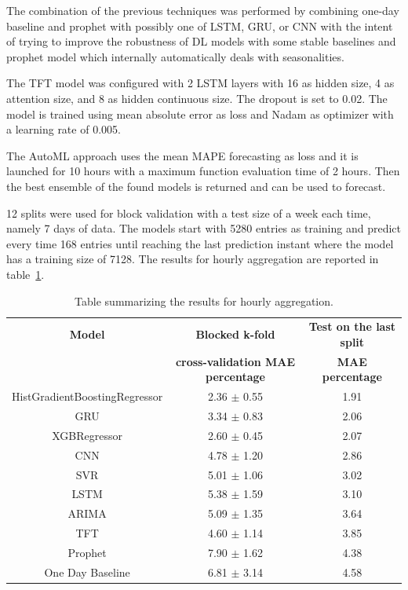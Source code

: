 The combination of the previous techniques was performed by combining one-day baseline and prophet with possibly one of LSTM, GRU, or CNN with the intent of trying to improve the robustness of DL models with some stable baselines and prophet model which internally automatically deals with seasonalities.

The TFT model was configured with 2 LSTM layers with 16 as hidden size, 4 as attention size, and 8 as hidden continuous size.
The dropout is set to 0.02.
The model is trained using mean absolute error as loss and Nadam as optimizer with a learning rate of 0.005.

The AutoML approach uses the mean MAPE forecasting as loss and it is launched for 10 hours with a maximum function evaluation time of 2 hours.
Then the best ensemble of the found models is returned and can be used to forecast.

12 splits were used for block validation with a test size of a week each time, namely 7 days of data.
The models start with 5280 entries as training and predict every time 168 entries until reaching the last prediction instant where the model has a training size of 7128.
The results for hourly aggregation are reported in table~\ref{tab:productionhourlyresults}.

\begin{table}[H]
\centering
\begin{tabular}{|c|c|c|}
\hline
\textbf{Model} & \textbf{Blocked k-fold} & \textbf{Test on the last split}\\
 & \textbf{cross-validation MAE percentage} & \textbf{MAE percentage}\\
\hline
HistGradientBoostingRegressor & 2.36 $\pm$ 0.55 & 1.91\\
\hline
GRU & 3.34 $\pm$ 0.83 & 2.06\\
\hline
XGBRegressor & 2.60 $\pm$ 0.45 & 2.07\\
\hline
CNN & 4.78 $\pm$ 1.20 & 2.86\\
\hline
SVR & 5.01 $\pm$ 1.06 & 3.02\\
\hline
LSTM & 5.38 $\pm$ 1.59 & 3.10\\
\hline
ARIMA & 5.09 $\pm$ 1.35 & 3.64\\
\hline
TFT & 4.60 $\pm$ 1.14 & 3.85\\
\hline
Prophet & 7.90 $\pm$ 1.62 & 4.38\\
\hline
One Day Baseline & 6.81 $\pm$ 3.14 & 4.58\\
\hline
\end{tabular}
\caption{Table summarizing the results for hourly aggregation.}
\label{tab:productionhourlyresults}
\end{table}

